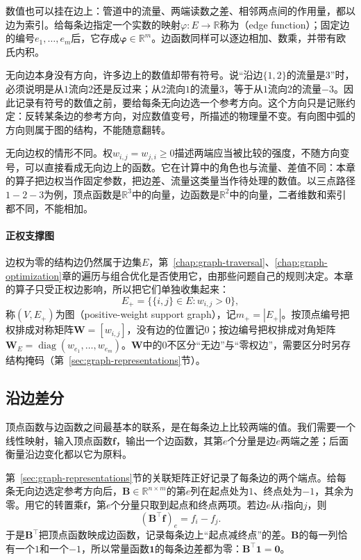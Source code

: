 数值也可以挂在边上：管道中的流量、两端读数之差、相邻两点间的作用量，都以边为索引。给每条边指定一个实数的映射$\varphi:E\to\mathbb R$称为（edge function）；固定边的编号$e_1,\ldots,e_m$后，它存成$\bm\varphi\in\mathbb R^m$。边函数同样可以逐边相加、数乘，并带有欧氏内积。

无向边本身没有方向，许多边上的数值却带有符号。说“沿边$\{1,2\}$的流量是$3$”时，必须说明是从$1$流向$2$还是反过来；从$2$流向$1$的流量$3$，等于从$1$流向$2$的流量$-3$。因此记录有符号的数值之前，要给每条无向边选一个参考方向。这个方向只是记账约定：反转某条边的参考方向，对应数值变号，所描述的物理量不变。有向图中弧的方向则属于图的结构，不能随意翻转。

无向边权的情形不同。权$w_{i,j}=w_{j,i}\geq0$描述两端应当被比较的强度，不随方向变号，可以直接看成无向边上的函数。它在计算中的角色也与流量、差值不同：本章的算子把边权当作固定参数，把边差、流量这类量当作待处理的数值。以三点路径$1-2-3$为例，顶点函数是$\mathbb R^3$中的向量，边函数是$\mathbb R^2$中的向量，二者维数和索引都不同，不能相加。

\paragraph{正权支撑图}
边权为零的结构边仍然属于边集$E$，第~\ref{chap:graph-traversal}、\ref{chap:graph-optimization}章的遍历与组合优化是否使用它，由那些问题自己的规则决定。本章的算子只受正权边影响，所以把它们单独收集起来：
\[
 E_+=\bigl\{\{i,j\}\in E:w_{i,j}>0\bigr\},
\]
称$(V,E_+)$为图（positive-weight support graph），记$m_+=|E_+|$。按顶点编号把权排成对称矩阵$\bm W=[w_{i,j}]$，没有边的位置记$0$；按边编号把权排成对角矩阵$\bm W_E=\operatorname{diag}(w_{e_1},\ldots,w_{e_m})$。$\bm W$中的$0$不区分“无边”与“零权边”，需要区分时另存结构掩码（第~\ref{sec:graph-representations}节）。

\subsection{沿边差分}
\label{sec:graph-spec-edge-differences}

顶点函数与边函数之间最基本的联系，是在每条边上比较两端的值。我们需要一个线性映射，输入顶点函数$\bm f$，输出一个边函数，其第$e$个分量是边$e$两端之差；后面衡量沿边变化都以它为原料。

第~\ref{sec:graph-representations}节的关联矩阵正好记录了每条边的两个端点。给每条无向边选定参考方向后，$\bm B\in\mathbb R^{n\times m}$的第$e$列在起点处为$1$、终点处为$-1$，其余为零。用它的转置乘$\bm f$，第$e$个分量只取到起点和终点两项。若边$e$从$i$指向$j$，则
\begin{equation}
 (\bm B^{\top}\bm f)_e=f_i-f_j .
 \label{eq:graph-spec-edge-difference}
\end{equation}
于是$\bm B^{\top}$把顶点函数映成边函数，记录每条边上“起点减终点”的差。$\bm B$的每一列恰有一个$1$和一个$-1$，所以常量函数$\bm1$的每条边差都为零：$\bm B^{\top}\bm1=\bm0$。

